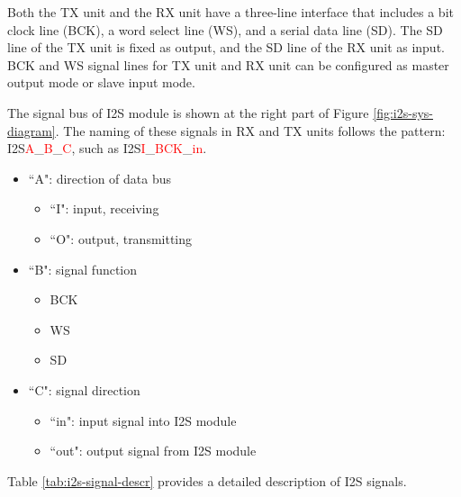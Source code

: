 \documentclass[main\_\_EN.tex]{subfiles}
\begin{document}
Both the TX unit and the RX unit have a three-line interface that includes a bit clock line (BCK), a word select line (WS), and a serial data line (SD). The SD line of the TX unit is fixed as output, and the SD line of the RX unit as input. BCK and WS signal lines for TX unit and RX unit can be configured as master output mode or slave input mode.



The signal bus of I2S module is shown at the right part of Figure \ref{fig:i2s-sys-diagram}. The naming of these signals in RX and TX units follows the pattern: I2S\textcolor{red}{A}\_\textcolor{red}{B}\_\textcolor{red}{C}, such as I2S\textcolor{red}{I}\_\textcolor{red}{BCK}\_\textcolor{red}{in}.

\begin{itemize}
    \item``A": direction of data bus
    \begin{itemize}
        \item ``I": input, receiving
        \item ``O": output, transmitting
    \end{itemize}
    \item ``B": signal function
    \begin{itemize}
        \item BCK
        \item WS
        \item SD
    \end{itemize}
    \item ``C": signal direction
    \begin{itemize}
        \item ``in": input signal into I2S module
        \item ``out": output signal from I2S module
    \end{itemize}
\end{itemize}

Table \ref{tab:i2s-signal-descr} provides a detailed description of I2S signals.
\end{document}
